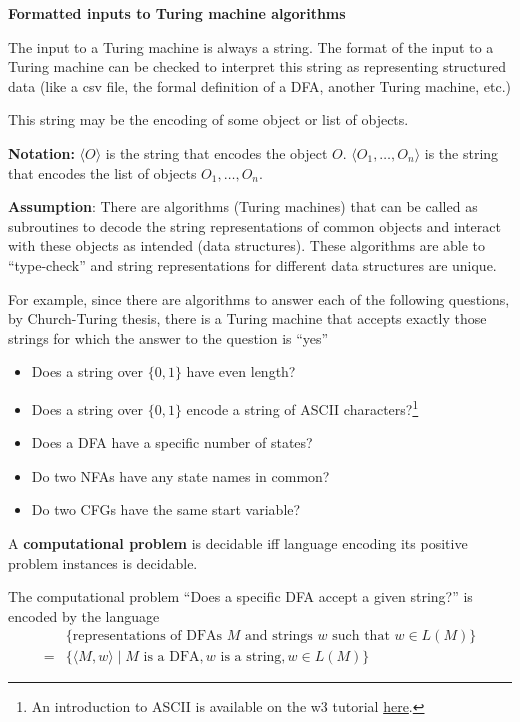\documentclass[12pt, oneside]{article}
\begin{document}
{\bf Formatted inputs to Turing machine algorithms}

The input to a Turing machine is always a string. 
The format of the input to a Turing machine can be checked to interpret 
this string as representing structured data (like a csv file, the formal definition of a DFA, another Turing machine, etc.)


This string may be the encoding of some object or  list of  objects.  

{\bf Notation:} $\langle O \rangle$ is the string that encodes the object $O$.
$\langle O_1, \ldots, O_n \rangle$ is the string that encodes the list of objects $O_1, \ldots, O_n$.

{\bf Assumption}: There are algorithms (Turing  machines) that can be called as subroutines
to decode the string representations of common objects and  interact with these objects as intended
(data structures). These algorithms are able to ``type-check'' and string representations for different
data structures are unique.
  
\newpage
For example, since there are algorithms to answer each of the following questions,
by Church-Turing thesis, there is a Turing machine that accepts exactly those strings for which the 
answer to the question is ``yes''
\begin{itemize}
    \item Does a string over $\{0,1\}$ have even length?

    \item Does a string over $\{0,1\}$ encode a string of ASCII characters?\footnote{An introduction to ASCII 
    is available on the w3 tutorial \href{https://www.w3schools.com/charsets/ref_html_ascii.asp}{here}.}

    \item Does a DFA have a specific number of states?

    \item Do two NFAs have any state names in common?

    \item Do two CFGs have the same start variable?

  \end{itemize}



A {\bf computational problem} is decidable iff language encoding its positive problem instances
is decidable.

The computational problem ``Does a specific DFA accept a given string?'' is encoded by the language
\begin{align*}
  &\{ \textrm{representations of DFAs $M$ and strings $w$ such that $w \in L(M)$}\}  \\
  =& \{ \langle M, w \rangle \mid M \textrm{ is a DFA}, w \textrm{ is a string}, w \in L(M) \}
\end{align*}
\end{document}
